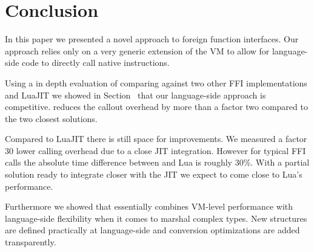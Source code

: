 \section{Conclusion}
In this paper we presented \NB a novel approach to foreign function interfaces.
Our approach relies only on a very generic extension of the VM to allow for language-side code to directly call native instructions.

Using a in depth evaluation of \NB comparing against two other \ST FFI implementations and LuaJIT we showed in Section~ that our language-side approach is competitive.
\NB reduces the callout overhead by more than a factor two compared to the two closest \ST solutions.

Compared to LuaJIT there is still space for improvements.
We measured a factor 30 lower calling overhead due to a close JIT integration.
However for typical FFI calls the absolute time difference between \NB and Lua is roughly $30\%$.
With a partial solution ready to integrate \NB closer with the JIT we expect to come close to Lua's performance.

Furthermore we showed that \NB essentially combines VM-level performance with language-side flexibility when it comes to marshal complex types.
New structures are defined practically at language-side and conversion optimizations are added transparently.


